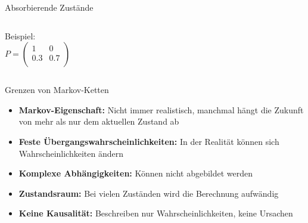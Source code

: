 \begin{frame}{Absorbierende Zustände}
    \begin{columns}
        Beispiel:
        \[
            P = \begin{pmatrix}
                1   & 0   \\
                0.3 & 0.7 \\
            \end{pmatrix}
        \]

        \begin{figure}[H]
            \centering
        \end{figure}
    \end{columns}

\end{frame}

\begin{frame}{Grenzen von Markov-Ketten}
    \begin{itemize}[<+->]
        \item \textbf{Markov-Eigenschaft:} Nicht immer realistisch, manchmal hängt die Zukunft von mehr als nur dem aktuellen Zustand ab
        \item \textbf{Feste Übergangswahrscheinlichkeiten:} In der Realität können sich Wahrscheinlichkeiten ändern
        \item \textbf{Komplexe Abhängigkeiten:} Können nicht abgebildet werden
        \item \textbf{Zustandsraum:} Bei vielen Zuständen wird die Berechnung aufwändig
        \item \textbf{Keine Kausalität:} Beschreiben nur Wahrscheinlichkeiten, keine Ursachen
    \end{itemize}
\end{frame}

